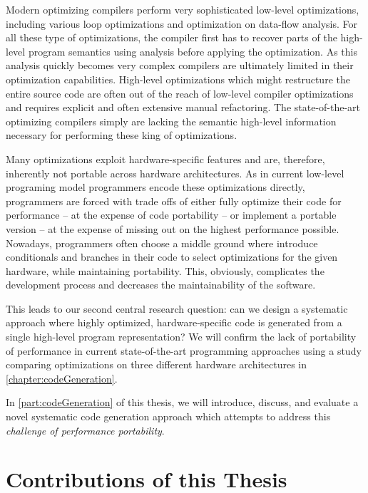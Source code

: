 Modern optimizing compilers perform very sophisticated low-level optimizations, including various loop optimizations and optimization on data-flow analysis.
For all these type of optimizations, the compiler first has to recover parts of the high-level program semantics using analysis before applying the optimization.
As this analysis quickly becomes very complex compilers are ultimately limited in their optimization capabilities.
High-level optimizations which might restructure the entire source code are often out of the reach of low-level compiler optimizations and requires explicit and often extensive manual refactoring.
The state-of-the-art optimizing compilers simply are lacking the semantic high-level information necessary for performing these king of optimizations.

Many optimizations exploit hardware-specific features and are, therefore, inherently not portable across hardware architectures.
As in current low-level programing model programmers encode these optimizations directly, programmers are forced with trade offs of either fully optimize their code for performance -- at the expense of code portability -- or implement a portable version -- at the expense of missing out on the highest performance possible.
Nowadays, programmers often choose a middle ground where introduce conditionals and branches in their code to select optimizations for the given hardware, while maintaining portability.
This, obviously, complicates the development process and decreases the maintainability of the software.

This leads to our second central research question:
can we design a systematic approach where highly optimized, hardware-specific code is generated from a single high-level program representation?
We will confirm the lack of portability of performance in current state-of-the-art programming approaches using a study comparing optimizations on three different hardware architectures in \autoref{chapter:codeGeneration}.

In \autoref{part:codeGeneration} of this thesis, we will introduce, discuss, and evaluate a novel systematic code generation approach which attempts to address this \emph{challenge of performance portability}.


\section{Contributions of this Thesis}

